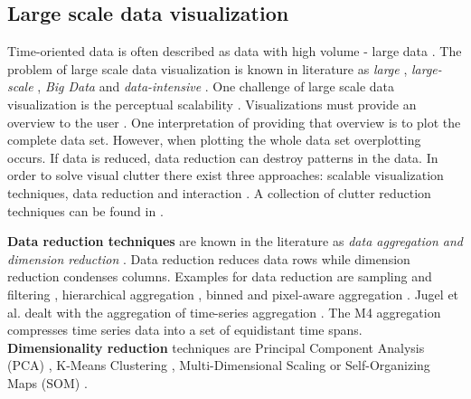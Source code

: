 \subsection{Large scale data visualization}
Time-oriented data is often described as data with high volume - large data \cite{Leonard2005, Lin2005}. The problem of large scale data visualization is known in literature as
\textit{large}  \cite{PiringerHarald2011,  Keim2001,  Keim1996,  Tennekes2013,  Yang2003,  Keim2005,  Wickham2013}, \textit{large-scale}  \cite{Leonard2005,  PiringerHarald2011,  Cuzzocrea2011,  Keim2005},  \textit{Big Data} \cite{Patil,  Keahey2013,  Chen2012} and \textit{data-intensive}  \cite{PhilipChen2014,  S.MD.Mujeeb2005}. One challenge of large scale data visualization is the perceptual scalability \cite{Wang2015}. Visualizations must provide an overview to the user \cite{Shneiderman2008}. One interpretation of providing that overview is to plot the complete data set. However, when plotting the whole data set overplotting occurs. If data is reduced, data reduction can destroy patterns in the data. In order to solve visual clutter there exist three approaches: scalable visualization techniques, data reduction and interaction \cite{Krzywinski2009,  Luo2012,  Fekete2002}.  A collection of  clutter reduction techniques can be found in \cite{Ellis2007}.
\par
\textbf{Data reduction techniques} are known in the literature as \textit{data aggregation and dimension reduction} \cite{FerreiradeOliveira2003,Aigner2011, Keim2005}. Data reduction reduces data rows while dimension reduction condenses columns. Examples for data reduction are sampling and filtering \cite{Fisher2012, Fekete2002}, hierarchical aggregation \cite{Elmqvist2010}
, binned and pixel-aware aggregation \cite{Liu2013, Li2016}. 
Jugel et al. dealt with the aggregation of time-series aggregation \cite{Jugel2014}. The M4 aggregation compresses time series data into a set of equidistant time spans. \\
\textbf{Dimensionality reduction} techniques are Principal Component Analysis (\gls{PCA})  \cite{Aigner2008}, K-Means Clustering  \cite{Hamilton2015}, Multi-Dimensional Scaling or  Self-Organizing Maps (\gls{SOM}) \cite{PiringerHarald2011}.

